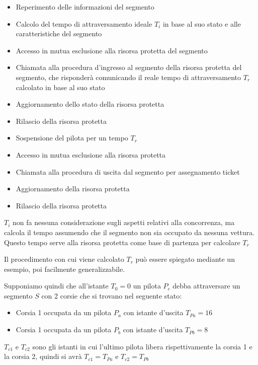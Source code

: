 \documentclass[a4paper,11pt, twoside]{book}
\begin{document}
      \begin{itemize}
	\item Reperimento delle informazioni del segmento
	\item Calcolo del tempo di attraversamento ideale $T_i$ in base al suo stato e alle caratteristiche del segmento
	\item Accesso in mutua esclusione alla risorsa protetta del segmento
	\item Chiamata alla procedura d'ingresso al segmento della risorsa protetta del segmento, che risponderà comunicando 
	      il reale tempo di attraversamento $T_r$ calcolato in base al suo stato
	\item Aggiornamento dello stato della risorsa protetta
	\item Rilascio della risorsa protetta
	\item Sospensione del pilota per un tempo $T_r$
	\item Accesso in mutua esclusione alla risorsa protetta
	\item Chiamata alla procedura di uscita dal segmento per assegnamento ticket
	\item Aggiornamento della risorsa protetta
	\item Rilascio della risorsa protetta
      \end{itemize}
      
      $T_i$ non fa nessuna considerazione sugli aspetti relativi alla concorrenza, ma calcola il tempo
      assumendo che il segmento non sia occupato da nessuna vettura. Questo tempo serve alla risorsa protetta come
      base di partenza per calcolare $T_r$
      
      Il procedimento con cui viene calcolato $T_r$ può essere spiegato mediante un esempio,
      poi facilmente generalizzabile.
      
      Supponiamo quindi che all'istante $T_0=0$ un pilota $P_c$ debba attraversare un segmento $S$ 
      con 2 corsie che si trovano nel seguente stato:
      
      \begin{itemize}
	\item Corsia 1 occupata da un pilota $P_a$ con istante d'uscita $T_{Pa}=16$
	\item Corsia 1 occupata da un pilota $P_b$ con istante d'uscita $T_{Pb}=8$
      \end{itemize}
      
      $T_{c1}$ e $T_{c2}$ sono gli istanti in cui l'ultimo pilota libera rispettivamente la corsia 1
      e la corsia 2, quindi si avrà $T_{c1} = T_{Pa}$ e $T_{c2} = T_{Pb}$
      
\end{document}
